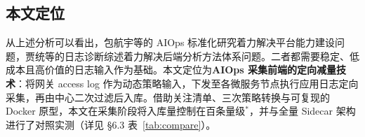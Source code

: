\subsection{本文定位}
从上述分析可以看出，包航宇等的 AIOps 标准化研究着力解决平台能力建设问题\cite{bao2023aiops}，贾统等的日志诊断综述着力解决后端分析方法体系问题\cite{jiatong2020logdiag}。二者都需要稳定、低成本且高价值的日志输入作为基础。本文定位为\textbf{AIOps 采集前端的定向减量技术}：将网关 access log 作为动态策略输入，下发至各微服务节点执行应用日志定向采集，再由中心二次过滤后入库。借助关注清单、三次策略转换与可复现的 Docker 原型，本文在采集阶段将入库量控制在百条量级$^*$，并与全量 Sidecar 架构进行了对照实测（详见 §6.3 表~\ref{tab:compare}）。

\vspace{0.3em}
